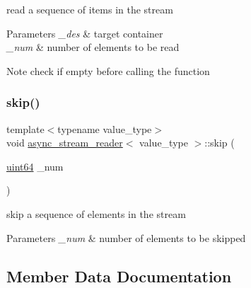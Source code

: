 read a sequence of items in the stream 


\begin{DoxyParams}{Parameters}
{\em \+\_\+des} & target container \\
\hline
{\em \+\_\+num} & number of elements to be read \\
\hline
\end{DoxyParams}
\begin{DoxyNote}{Note}
check if empty before calling the function 
\end{DoxyNote}
\mbox{\label{classasync__stream__reader_a66bc0e20739b27b9c703be9254cdbe05}} 
\subsubsection{\texorpdfstring{skip()}{skip()}}
{\footnotesize\ttfamily template$<$typename value\+\_\+type$>$ \\
void \hyperlink{classasync__stream__reader}{async\+\_\+stream\+\_\+reader}$<$ value\+\_\+type $>$\+::skip (\begin{DoxyParamCaption}\item[{\hyperlink{types_8h_a60e8696a4678cd348e991a1f172e53f7}{uint64}}]{\+\_\+num }\end{DoxyParamCaption})\hspace{0.3cm}{\ttfamily [inline]}}



skip a sequence of elements in the stream 


\begin{DoxyParams}{Parameters}
{\em \+\_\+num} & number of elements to be skipped \\
\hline
\end{DoxyParams}


\subsection{Member Data Documentation}
\mbox{\label{classasync__stream__reader_a5268366ca42bd2ef430e9e0817e9b274}} 
